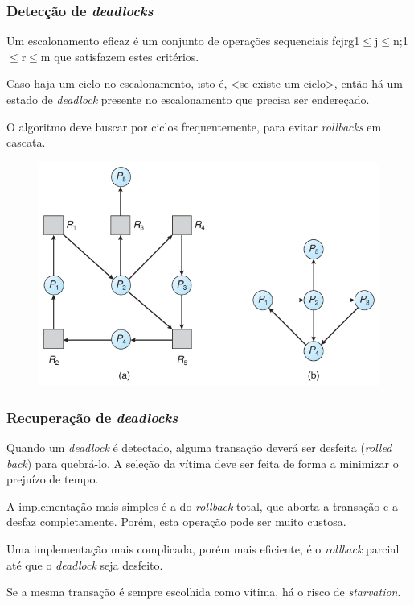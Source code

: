 \documentclass{beamer}
\begin{document}
\begin{frame}
    \frametitle{Detecção de \emph{deadlocks}}

    Um escalonamento eficaz é um conjunto de operações sequenciais fcjrg1$\leq$j$\leq$n;1$\leq$r$\leq$m que satisfazem estes critérios.

    \medskip
    Caso haja um ciclo no escalonamento, isto é, <se existe um ciclo>, então há um estado de \emph{deadlock} presente no escalonamento que precisa ser endereçado.

    \medskip
    O algoritmo deve buscar por ciclos frequentemente, para evitar \emph{rollbacks} em cascata.

    \medskip
    \begin{figure}
        \includegraphics[width=0.8\linewidth]{deadlockdetection1.jpg}
    \end{figure}
\end{frame}



\begin{frame}
    \frametitle{Recuperação de \emph{deadlocks}}

    Quando um \emph{deadlock} é detectado, alguma transação deverá ser desfeita (\emph{rolled back}) para quebrá-lo. A seleção da vítima deve ser feita de forma a minimizar o prejuízo de tempo.

    \medskip
    A implementação mais simples é a do \emph{rollback} total, que aborta a transação e a desfaz completamente. Porém, esta operação pode ser muito custosa.
\end{frame}


\begin{frame}
    Uma implementação mais complicada, porém mais eficiente, é o \emph{rollback} parcial até que o \emph{deadlock} seja desfeito.

    \medskip
    Se a mesma transação é sempre escolhida como vítima, há o risco de \emph{starvation}.

\end{frame}
\end{document}
